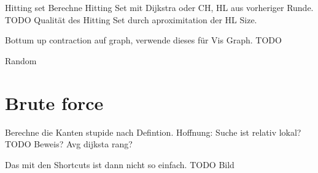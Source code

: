 Hitting set
Berechne Hitting Set mit Dijkstra oder CH, HL aus vorheriger Runde.
TODO Qualität des Hitting Set durch aproximitation der HL Size.

Bottum up contraction auf graph, verwende dieses für Vis Graph.
TODO

Random


\section{Brute force}

Berechne die Kanten stupide nach Defintion. Hoffnung: Suche ist relativ lokal? TODO Beweis? Avg dijksta rang?

Das mit den Shortcuts ist dann nicht so einfach. TODO Bild

